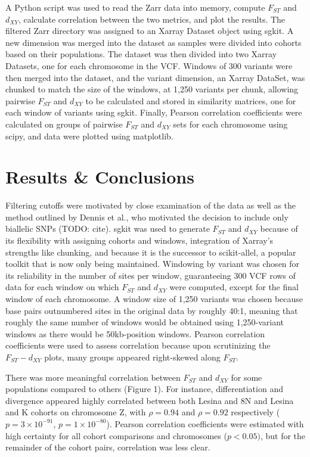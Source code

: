 \documentclass{article}
\begin{document}
A Python script was used to read the Zarr data into memory, compute $F_{ST}$ and $d_{XY}$, calculate correlation between the two metrics, and plot the results. The filtered Zarr directory was assigned to an Xarray Dataset object using sgkit. A new dimension was merged into the dataset as samples were divided into cohorts based on their populations. The dataset was then divided into two Xarray Datasets, one for each chromosome in the VCF. Windows of 300 variants were then merged into the dataset, and the variant dimension, an Xarray DataSet, was chunked to match the size of the windows, at 1,250 variants per chunk, allowing pairwise $F_{ST}$ and $d_{XY}$ to be calculated and stored in similarity matrices, one for each window of variants using sgkit. Finally, Pearson correlation coefficients were calculated on groups of pairwise $F_{ST}$ and $d_{XY}$ sets for each chromosome using scipy, and data were plotted using matplotlib.

\section{Results \& Conclusions}

Filtering cutoffs were motivated by close examination of the data as well as the method outlined by Dennis et al., who motivated the decision to include only biallelic SNPs (TODO: cite). sgkit was used to generate $F_{ST}$ and $d_{XY}$ because of its flexibility with assigning cohorts and windows, integration of Xarray's strengths like chunking, and because it is the successor to scikit-allel, a popular toolkit that is now only being maintained. Windowing by variant was chosen for its reliability in the number of sites per window, guaranteeing 300 VCF rows of data for each window on which $F_{ST}$ and $d_{XY}$ were computed, except for the final window of each chromosome. A window size of 1,250 variants was chosen because base pairs outnumbered sites in the original data by roughly 40:1, meaning that roughly the same number of windows would be obtained using 1,250-variant windows as there would be 50kb-position windows. Pearson correlation coefficients were used to assess correlation because upon scrutinizing the $F_{ST}-d_{XY}$ plots, many groups appeared right-skewed along $F_{ST}$.

There was more meaningful correlation between $F_{ST}$ and $d_{XY}$ for some populations compared to others (Figure 1). For instance, differentiation and divergence appeared highly correlated between both Lesina and 8N and Lesina and K cohorts on chromosome Z, with $\rho = 0.94$ and $\rho = 0.92$ respectively ($p = 3 \times 10^{-91}$, $p=1\times10^{-80}$). Pearson correlation coefficients were estimated with high certainty for all cohort comparisons and chromosomes ($p<0.05)$, but for the remainder of the cohort pairs, correlation was less clear.
\end{document}

